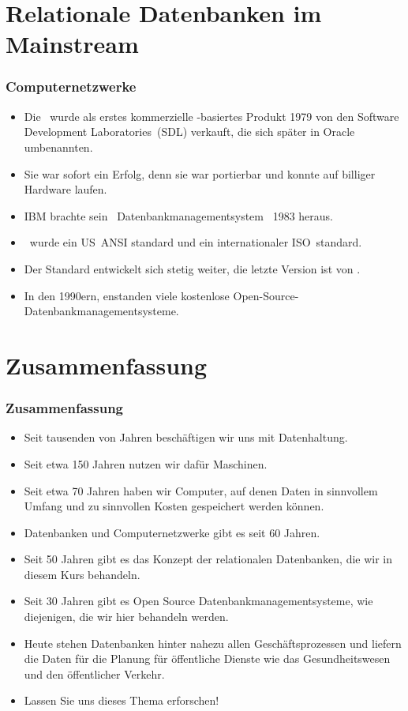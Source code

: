 \documentclass[aspectratio=169,mathserif,notheorems]{beamer}%
\begin{document}
\section{Relationale Datenbanken im Mainstream}
%
%
\begin{frame}%
\frametitle{Computernetzwerke}%
\begin{itemize}%
\item Die \oracleDB\ wurde als erstes kommerzielle \sql-basiertes Produkt 1979 von den Software Development Laboratories~(SDL) verkauft, die sich später in Oracle umbenannten\cite{C20245YOQ,O2007OTHTMIMIOHWCFTPWMIH}.%
\item<2-> Sie war sofort ein Erfolg, denn sie war portierbar und konnte auf billiger Hardware laufen.%
\item<3-> IBM brachte sein \sql\ Datenbankmanagementsystem \ibmDB\ 1983 heraus\cite{C20245YOQ,HS2013THAGOID,CWDS2007UDLVWE}.%
\item<4-> \sql\ wurde \citeyear{ANSIX3135} ein US~ANSI standard und \citeyear{ISO90751987} ein internationaler ISO~standard\cite{ANSIX3135,ISO90751987}.%
\item<5-> Der Standard entwickelt sich stetig weiter, die letzte Version ist von \citeyear{ISOIEC9707112023E}\cite{ISOIEC9707112023E}.%
\item<6-> In den 1990ern, enstanden viele kostenlose Open-Source-Datenbankmanagementsysteme\cite{C20245YOQ}.%
\end{itemize}%
\end{frame}%
%
\section{Zusammenfassung}%
%
\begin{frame}%
\frametitle{Zusammenfassung}%
\begin{itemize}%
\item Seit tausenden von Jahren beschäftigen wir uns mit Datenhaltung.%
\item<2-> Seit etwa 150 Jahren nutzen wir dafür Maschinen.%
\item<3-> Seit etwa 70 Jahren haben wir Computer, auf denen Daten in sinnvollem Umfang und zu sinnvollen Kosten gespeichert werden können.%
\item<4-> Datenbanken und Computernetzwerke gibt es seit 60 Jahren.%
\item<5-> Seit 50 Jahren gibt es das Konzept der relationalen Datenbanken, die wir in diesem Kurs behandeln.%
\item<6-> Seit 30 Jahren gibt es Open Source Datenbankmanagementsysteme, wie diejenigen, die wir hier behandeln werden.%
\item<7-> Heute stehen Datenbanken hinter nahezu allen Geschäftsprozessen und liefern die Daten für die Planung für öffentliche Dienste wie das Gesundheitswesen und den öffentlicher Verkehr.%
\item<8-> Lassen Sie uns dieses Thema erforschen!%
\end{itemize}%
\end{frame}%
%
\endPresentation%
\end{document}
